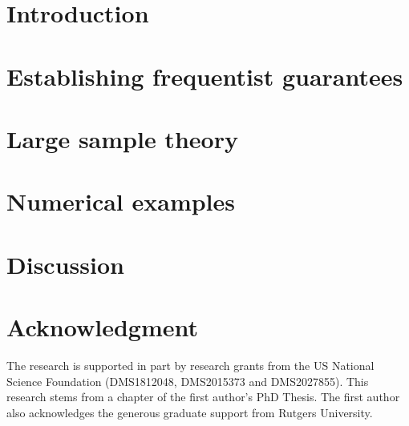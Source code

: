 \documentclass{nejsds_ST}
\theoremstyle{remark}
\begin{document}
\begin{frontmatter}
\begin{keyword}
\end{keyword}

\end{frontmatter}
	
\section{Introduction} \label{sec:intro}
	
\section{Establishing frequentist guarantees}\label{sec:thms}
	 
\section{Large sample theory}\label{sec:largeSamp}
	
\section{Numerical examples} \label{sec:ex}

%
\section{Discussion} \label{sec:discuss}

	
\section*{Acknowledgment}
The research is supported in part by research grants from the US National Science Foundation %
(DMS1812048, DMS2015373 and DMS2027855). 
This research stems from a chapter of the first author's PhD Thesis. 
The first author also acknowledges the generous graduate support from Rutgers University.
	
\appendix

	

	
\end{document}
